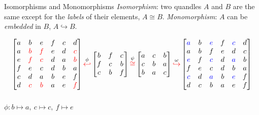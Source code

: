 \begin{frame}{Isomorphisms and Monomorphisms}
\emph{Isomorphism}: two quandles $A$ and $B$ are the same except for the \emph{labels} of their elements, $A \cong B$.\newline
\emph{Monomorphism}: $A$ can be \emph{embedded} in $B$, $A \hookrightarrow B$.
\begin{center}
    \textcolor{darkred}{} 
\end{center}
\small
\[\begin{bmatrix}
 a& b& e& f& c& d \\
     a& \textcolor{red}{b} & \textcolor{red}{f}& e& d& \textcolor{red}{c} \\
     e& \textcolor{red}{f}& \textcolor{red}{c}& d& a& \textcolor{red}{b} \\
     f& e& c& d& b& a \\
     c& d& a& b& e& f \\
     d& \textcolor{red}{c}& \textcolor{red}{b}& a& e& \textcolor{red}{f} 
\end{bmatrix} \overset{\phi}{\textcolor{red}{\hookleftarrow}}\begin{bmatrix}
b& f & c \\
f & c & b\\
c & b& f
\end{bmatrix}
\overset{\psi}{\textcolor{red}{\cong}} \begin{bmatrix}
a& c & b \\
c & b & a\\
b & a& c
\end{bmatrix} \overset{\omega}{\textcolor{red}{\hookrightarrow}}
\begin{bmatrix}
 \textcolor{blue}{a}& b& \textcolor{blue}{e}& f& \textcolor{blue}{c}& d \\
     a& b & f& e& d& c \\
     \textcolor{blue}{e}& f& \textcolor{blue}{c}& d& \textcolor{blue}{a}& b \\
     f& e& c& d& b& a \\
     \textcolor{blue}{c}& d& \textcolor{blue}{a}& b& \textcolor{blue}{e}& f \\
     d& c& b& a& e& f 
\end{bmatrix}\]\vspace{1em}
\begin{columns}
\begin{column}{0.33\linewidth}
\begin{center}
    $\phi: b \mapsto a,~c\mapsto c,~f\mapsto e$\newline


\end{center}
\end{column}
\end{columns}
\end{frame}
